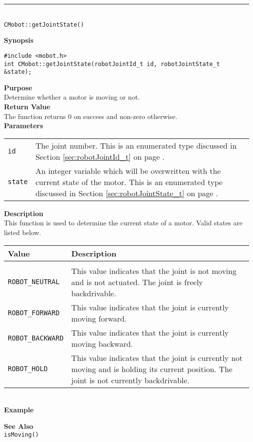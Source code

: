 \noindent
\vspace{5pt}
\rule{4.5in}{0.015in}\\
\noindent
{\LARGE \texttt{CMobot::getJointState()}}\\
{}

\noindent
{\bf Synopsis}
\vspace{-8pt}
\begin{verbatim}
#include <mobot.h>
int CMobot::getJointState(robotJointId_t id, robotJointState_t &state);
\end{verbatim}

\noindent
{\bf Purpose}\\
Determine whether a motor is moving or not.\\

\noindent
{\bf Return Value}\\
The function returns 0 on success and non-zero otherwise.\\

\noindent
{\bf Parameters}
\vspace{-0.1in}
\begin{description}
\item               
\begin{tabular}{p{10 mm}p{145 mm}}
\texttt{id} & The joint number. This is an enumerated type 
discussed in Section \ref{sec:robotJointId_t} on page
\pageref{sec:robotJointId_t}.\\
\texttt{state} & An integer variable which will be overwritten with the current state of the motor. 
This is an enumerated type 
discussed in Section \ref{sec:robotJointState_t} on page
\pageref{sec:robotJointState_t}.
\end{tabular}
\end{description}

\noindent
{\bf Description}\\
This function is used to determine the current state of a motor. Valid states are listed below.

\begin{tabular}{p{3.3cm}p{10cm}} \hline 
Value & Description \\
\hline \\
\texttt{ROBOT\_NEUTRAL}& This value indicates that the joint is not moving and is not actuated. The joint is freely backdrivable. \\
\texttt{ROBOT\_FORWARD}& This value indicates that the joint is currently moving forward. \\
\texttt{ROBOT\_BACKWARD}& This value indicates that the joint is currently moving backward. \\
\texttt{ROBOT\_HOLD}& This value indicates that the joint is currently not moving and is holding its current position. The joint is not currently backdrivable. \\
\hline
\end{tabular}\\


\noindent
{\bf Example}\\
\noindent

\noindent
{\bf See Also}\\
\texttt{isMoving()}\\
